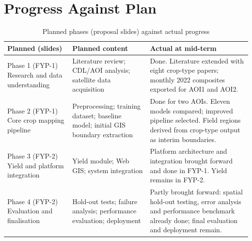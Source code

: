\section{Progress Against Plan}
\begin{table}[htbp]
\centering\small
\caption{Planned phases (proposal slides) against actual progress}
\label{tab:progress}
\begin{tabularx}{\textwidth}{L{3.3cm} L{4.5cm} Y}
\toprule
\textbf{Planned (slides)} & \textbf{Planned content} & \textbf{Actual at mid-term}\\
\midrule
Phase 1 (FYP-1) Research and data understanding & Literature review; CDL/AOI analysis; satellite data acquisition & Done. Literature extended with eight crop-type papers; monthly 2022 composites exported for AOI1 and AOI2.\\
Phase 2 (FYP-1) Core crop mapping pipeline & Preprocessing; training dataset; baseline model; initial GIS boundary extraction & Done for two AOIs. Eleven models compared; improved pipeline selected. Field regions derived from crop-type output as interim boundaries.\\
Phase 3 (FYP-2) Yield and platform integration & Yield module; Web GIS; system integration & Platform architecture and integration brought forward and done in FYP-1. Yield remains in FYP-2.\\
Phase 4 (FYP-2) Evaluation and finalisation & Hold-out tests; failure analysis; performance evaluation; deployment & Partly brought forward: spatial hold-out testing, error analysis and performance benchmark already done; final evaluation and deployment remain.\\
\bottomrule
\end{tabularx}
\end{table}

